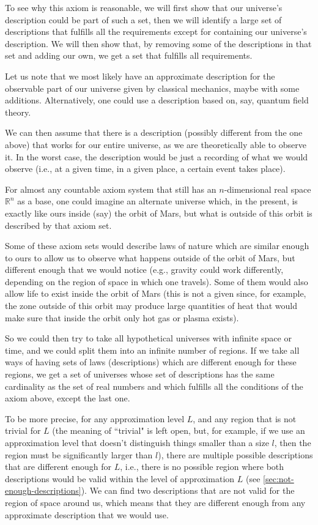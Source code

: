 \documentclass[a4paper
,draft
]{article}
\def\reale{\mathbb{R}}
\newcommand{\ghilimele}[1]{``#1"}
\begin{document}
To see why this axiom is reasonable, we will first show that our universe's
description could be part of such a set, then we will identify a large set
of descriptions that fulfills all the requirements except for containing
our universe's description. We will then show that, by removing some of the
descriptions in that set and adding our own, we get a set that fulfills all
requirements.

Let us note that
we most likely have an approximate description for the observable part
of our universe
given by classical mechanics, maybe with some additions.
Alternatively, one could use a description based on, say, quantum field theory.

We can then assume that there is a description
(possibly different from the one above) that works for our entire universe,
as we are theoretically able to observe it. In the worst case, the description
would be just a recording of what we would observe (i.e., at a given time, in
a given place, a certain event takes place).

For almost any countable axiom system that still
has an $n$-dimensional real space $\reale^n$ as a base,
one could imagine an alternate universe
which, in the present, is exactly like ours inside (say) the orbit of Mars,
but what is outside of this orbit is described by that axiom set.

Some of these axiom sets would describe laws of nature which are similar enough
to ours to allow us to observe what happens outside of the orbit of Mars,
but different enough that
we would notice (e.g., gravity could work differently, depending on the region
of space in which one travels). Some of them would also allow life
to exist inside the orbit of Mars (this is not a given since, for example, the zone
outside of this orbit may produce large quantities of heat that
would make sure that inside the orbit only hot gas or plasma exists).

So we could then try to take all hypothetical universes with infinite space
or time, and we could split them into an infinite number of regions. If we take
all ways of having sets of laws (descriptions) which are different enough
for these regions,
we get a set of universes whose set of descriptions has the same cardinality
as the set of real numbers and which fulfills all the conditions of the axiom
above, except the last one.

To be more precise, for any approximation level $L$, and any region that
is not trivial for $L$
(the meaning of \ghilimele{trivial} is left open, but, for example,
if we use an approximation level that doesn't distinguish things smaller
than a size $l$, then the region must be significantly larger than $l$),
there are multiple possible descriptions that
are different enough for $L$, i.e., there is no possible region where both
descriptions
would be valid within the level of approximation $L$
(see \ref{sec:not-enough-descriptions}).
We can find two descriptions that are not valid for the region of space around
us, which means that they are different enough from any approximate
description that we would use.
\end{document}
